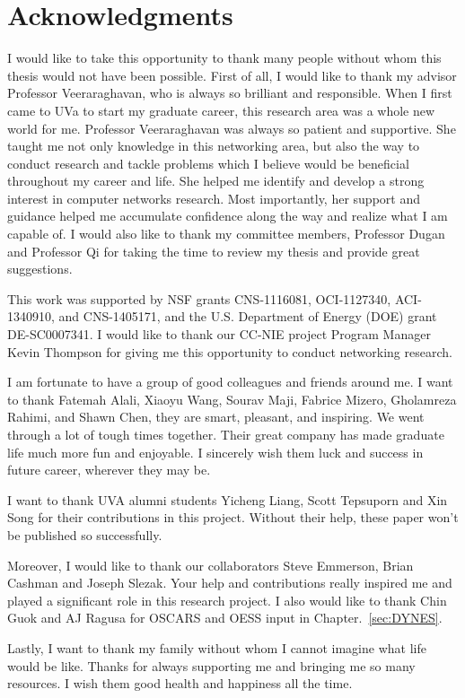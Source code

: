\chapter*{Acknowledgments} 

I would like to take this opportunity to thank many people without whom this thesis would not have been possible.  First of all, I would like to thank my advisor Professor Veeraraghavan, who is always so brilliant and responsible. When I first came to UVa to start my graduate career, this research area was a whole new world for me. Professor Veeraraghavan was always so patient and supportive. She taught me not only knowledge in this networking area, but also the way to conduct research and tackle problems which I believe would be beneficial throughout my career and life. She helped me identify and develop a strong interest in computer networks research. Most importantly, her support and guidance helped me accumulate confidence along the way and realize what I am capable of. I would also like to thank my committee members, Professor Dugan and Professor Qi for taking the time to review my thesis and provide great suggestions.

This work was supported by NSF grants CNS-1116081,
OCI-1127340, ACI-1340910, and CNS-1405171, and the U.S.
Department of Energy (DOE) grant DE-SC0007341. I would like to thank our CC-NIE project Program Manager Kevin Thompson for giving me this opportunity to conduct networking research. 

I am fortunate to have a group of good colleagues and friends around me. I want to thank Fatemah Alali, Xiaoyu Wang, Sourav Maji, Fabrice Mizero, Gholamreza Rahimi, and Shawn Chen, they are smart, pleasant, and inspiring. We went through a lot of tough times together. Their great company has made graduate life much more fun and enjoyable. I sincerely wish them luck and success in future career, wherever they may be.

I want to thank UVA alumni students Yicheng Liang, Scott Tepsuporn and Xin Song for their contributions in this project. Without their help, these paper won't be published so successfully.

Moreover, I would like to thank our collaborators Steve Emmerson, Brian Cashman and Joseph Slezak. Your help and contributions really inspired me and played a significant role in this research project. I also would like to thank Chin Guok and AJ Ragusa for OSCARS and OESS input in Chapter.~\ref{sec:DYNES}.

Lastly, I want to thank my family without whom I cannot imagine what life would be like. Thanks for always supporting me and bringing me so many resources. I wish them good health and happiness all the time.


